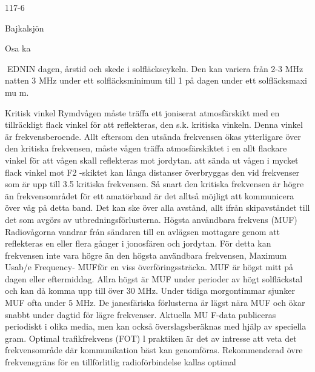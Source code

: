 \documentclass[a4paper,twoside,twocolumn,openright]{book}
\begin{document}
{{{{{{117-6

Bajkalsjön

Osa ka

EDNIN
dagen, årstid och skede i solfläckscykeln.
Den kan variera från 2-3 MHz
natten
3 MHz
under ett solfläcksminimum till 1
på dagen under ett solfläcksmaxi mu m.

Kritisk vinkel
Rymdvågen måste träffa ett joniserat atmosfärskikt med en tillräckligt flack vinkel för att
reflekteras, den s.k. kritiska vinkeln. Denna
vinkel är frekvensberoende. Allt eftersom
den utsända frekvensen ökas ytterligare över
den kritiska frekvensen, måste vågen träffa
atmosfärskiktet i en allt flackare vinkel för att
vågen skall reflekteras mot jordytan.
att sända ut vågen i mycket flack vinkel mot
F2 -skiktet kan långa distanser överbryggas
den
vid frekvenser som är upp till 3.5
kritiska frekvensen.
Så snart den kritiska frekvensen är högre
än frekvensområdet för ett amatörband är
det alltså möjligt att kommunicera över
våg på detta band. Det kan ske över alla
avstånd, allt ifrån skipavståndet till det som
avgörs av utbredningsförlusterna.
Högsta användbara frekvens (MUF)
Radiovågorna vandrar från sändaren till en
avlägsen mottagare genom att reflekteras
en eller flera gånger i jonosfären och jordytan. För detta kan frekvensen inte vara
högre än den högsta användbara frekvensen, Maximum Usab/e Frequency- MUFför en viss överföringssträcka.
MUF är högst mitt på dagen eller
eftermiddag. Allra högst är MUF under perioder av högt solfläckstal och kan då komma
upp till över 30 MHz. Under tidiga morgontimmar sjunker MUF ofta under 5 MHz.
De janesfäriska förlusterna är lägst nära
MUF och ökar snabbt under dagtid för lägre
frekvenser.
Aktuella MU F-data publiceras periodiskt
i olika media, men kan också överslagsberäknas med hjälp av speciella
gram.
Optimal trafikfrekvens (FOT)
l praktiken är det av intresse att veta det
frekvensområde där kommunikation bäst kan
genomföras.
Rekommenderad övre frekvensgräns för
en tillförlitlig radioförbindelse kallas optimal

}}}}}}
\end{document}

